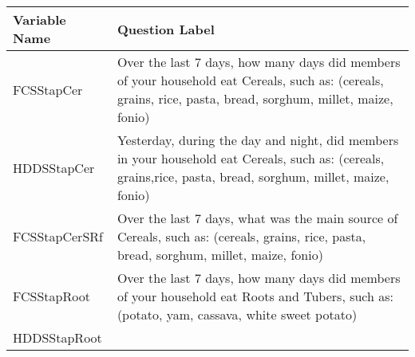 \documentclass[
]{article}
\begin{document}
\begin{longtable}[]{@{}ll@{}}
\toprule
\begin{minipage}[b]{0.22\columnwidth}\raggedright
Variable Name\strut
\end{minipage} & \begin{minipage}[b]{0.72\columnwidth}\raggedright
Question Label\strut
\end{minipage}\tabularnewline
\midrule
\endhead
\begin{minipage}[t]{0.22\columnwidth}\raggedright
FCSStapCer\strut
\end{minipage} & \begin{minipage}[t]{0.72\columnwidth}\raggedright
Over the last 7 days, how many days did members of your household eat Cereals, such as: (cereals, grains, rice, pasta, bread, sorghum, millet, maize, fonio)\strut
\end{minipage}\tabularnewline
\begin{minipage}[t]{0.22\columnwidth}\raggedright
HDDSStapCer\strut
\end{minipage} & \begin{minipage}[t]{0.72\columnwidth}\raggedright
Yesterday, during the day and night, did members in your household eat Cereals, such as: (cereals, grains,rice, pasta, bread, sorghum, millet, maize, fonio)\strut
\end{minipage}\tabularnewline
\begin{minipage}[t]{0.22\columnwidth}\raggedright
FCSStapCerSRf\strut
\end{minipage} & \begin{minipage}[t]{0.72\columnwidth}\raggedright
Over the last 7 days, what was the main source of Cereals, such as: (cereals, grains, rice, pasta, bread, sorghum, millet, maize, fonio)\strut
\end{minipage}\tabularnewline
\begin{minipage}[t]{0.22\columnwidth}\raggedright
FCSStapRoot\strut
\end{minipage} & \begin{minipage}[t]{0.72\columnwidth}\raggedright
Over the last 7 days, how many days did members of your household eat Roots and Tubers, such as: (potato, yam, cassava, white sweet potato)\strut
\end{minipage}\tabularnewline
\begin{minipage}[t]{0.22\columnwidth}\raggedright
HDDSStapRoot\strut
\end{minipage} & \begin{minipage}[t]{0.72\columnwidth}\raggedright

\end{minipage}
\end{longtable}
\end{document}
